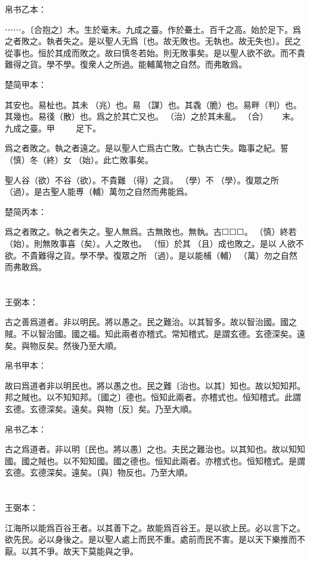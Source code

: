 \documentclass[a5paper]{ctexbook}
\begin{document}
    帛书乙本：

    ⋯⋯。〔合抱之〕木。生於毫末。九成之臺。作於虆土。百千之高。始於足下。爲之者敗之。執者失之。是以聖人无爲〔也。故无敗也。无執也。故无失也〕。民之從事也。恒於其成而敗之。故曰慎冬若始。則无敗事矣。是以聖人欲不欲。而不貴難得之貨。學不學。復衆人之所過。能輔萬物之自然。而弗敢爲。

    楚简甲本：

    其安也。易杫也。其未󶵆（兆）也。易𢘃（謀）也。其毳（脆）也。易畔（判）也。其幾也。易㣤（散）也。爲之於其亡又也。𥿆（治）之於其未亂。𣌭（合）☐☐☐☐☐☐末。九成之臺。甲☐☐☐☐☐☐☐☐☐足下。

    爲之者敗之。執之者遠之。是以聖人亡爲古亡敗。亡執古亡失。臨事之紀。誓（慎）冬（終）女󶴢（始）。此亡敗事矣。

    聖人谷（欲）不谷（欲）。不貴難󶴫（得）之貨。𡥈（學）不𡥈（學）。復眾之所󶴬（過）。是古聖人能尃（輔）萬勿之自然而弗能爲。

    楚简丙本：

    爲之者敗之。執之者失之。聖人無爲。古無敗也。無執。古☐☐☐。󶴤（慎）終若󶴪（始）。則無敗事喜（矣）。人之敗也。𠄨（恒）於其𠭯（且）成也敗之。是以☐人欲不欲。不貴難得之貨。學不學。復眾之所󶴭（過）。是以能㭪（輔）󼧕（萬）勿之自然而弗敢爲。

    \chapter{}
    王弼本：

    古之善爲道者。非以明民。將以愚之。民之難治。以其智多。故以智治國。國之賊。不以智治國。國之福。知此兩者亦稽式。常知稽式。是謂玄德。玄德深矣。遠矣。與物反矣。然後乃至大順。

    
    帛书甲本：

    故曰爲道者非以明民也。將以愚之也。民之難〔治也。以其〕知也。故以知知邦。邦之賊也。以不知知邦。〔國之〕德也。恒知此兩者。亦稽式也。恒知稽式。此謂玄德。玄德深矣。遠矣。與物〔反〕矣。乃至大順。

    帛书乙本：

    古之爲道者。非以明〔民也。將以愚〕之也。夫民之難治也。以其知也。故以知知國。國之賊也。以不知知國。國之德也。恒知此兩者。亦稽式也。恒知稽式。是謂玄德。玄德深矣。遠矣。〔與〕物反也。乃至大順。

    \chapter{}
    王弼本：

    江海所以能爲百谷王者。以其善下之。故能爲百谷王。是以欲上民。必以言下之。欲先民。必以身後之。是以聖人處上而民不重。處前而民不害。是以天下樂推而不厭。以其不爭。故天下莫能與之爭。
\end{document}
